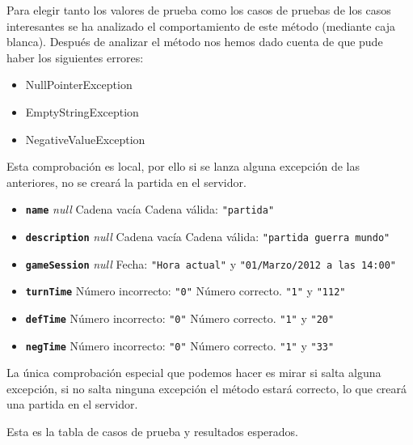 Para elegir tanto los valores de prueba como los casos de pruebas de los casos interesantes se ha analizado el comportamiento de este método (mediante caja blanca). Después de analizar el método nos hemos dado cuenta de que pude haber los siguientes errores:
\begin{itemize}
\item NullPointerException
\item EmptyStringException
\item NegativeValueException
\end{itemize}
Esta comprobación es local, por ello si se lanza alguna excepción de las anteriores, no se creará la partida en el servidor.

\begin{itemize}
\item \textbf{\texttt{name}}
\subitem \textit{null}
\subitem Cadena vacía
\subitem Cadena válida: \texttt{"partida"}

\item \textbf{\texttt{description}}
\subitem \textit{null}
\subitem Cadena vacía
\subitem Cadena válida: \texttt{"partida guerra mundo"}

\item \textbf{\texttt{gameSession}}
\subitem \textit{null}
\subitem Fecha: \texttt{"Hora actual"} y \texttt{"01/Marzo/2012 a las 14:00"}

\item \textbf{\texttt{turnTime}}
\subitem Número incorrecto: \texttt{"0"}
\subitem Número correcto. \texttt{"1"} y \texttt{"112"}

\item \textbf{\texttt{defTime}}
\subitem Número incorrecto: \texttt{"0"}
\subitem Número correcto. \texttt{"1"} y \texttt{"20"}

\item \textbf{\texttt{negTime}}
\subitem Número incorrecto: \texttt{"0"}
\subitem Número correcto. \texttt{"1"} y \texttt{"33"}
\end{itemize}

La única comprobación especial que podemos hacer es mirar si salta alguna excepción, si no salta ninguna excepción el método estará correcto, lo que creará una partida en el servidor.

Esta es la tabla de casos de prueba y resultados esperados.

